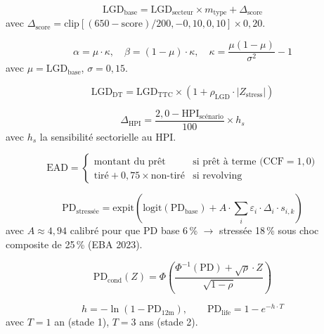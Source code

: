 \documentclass[10pt, a4paper, oneside]{report}
\theoremstyle{definition}
\begin{document}
\begin{equation}
\text{LGD}_{\text{base}} = \text{LGD}_{\text{secteur}} \times m_{\text{type}} + \Delta_{\text{score}}
\label{eq:lgd-base}
\end{equation}
avec $\Delta_{\text{score}} = \text{clip}[(650 - \text{score})/200, -0{,}10, 0{,}10] \times 0{,}20$.

\begin{equation}
\alpha = \mu \cdot \kappa, \quad \beta = (1 - \mu) \cdot \kappa, \quad \kappa = \frac{\mu(1-\mu)}{\sigma^2} - 1
\label{eq:beta-params}
\end{equation}
avec $\mu = \text{LGD}_{\text{base}}$, $\sigma = 0{,}15$.

\begin{equation}
\text{LGD}_{\text{DT}} = \text{LGD}_{\text{TTC}} \times (1 + \rho_{\text{LGD}} \cdot |Z_{\text{stress}}|)
\label{eq:lgd-downturn}
\end{equation}

\begin{equation}
\Delta_{\text{HPI}} = \frac{2{,}0 - \text{HPI}_{\text{scénario}}}{100} \times h_s
\label{eq:lgd-hpi}
\end{equation}
avec $h_s$ la sensibilité sectorielle au HPI.

\begin{equation}
\text{EAD} = \begin{cases} \text{montant du prêt} & \text{si prêt à terme (CCF} = 1{,}0\text{)} \\ \text{tiré} + 0{,}75 \times \text{non-tiré} & \text{si revolving} \end{cases}
\label{eq:ead}
\end{equation}

\begin{equation}
\text{PD}_{\text{stressée}} = \text{expit}\!\left(\text{logit}(\text{PD}_{\text{base}}) + A \cdot \sum_i \varepsilon_i \cdot \Delta_i \cdot s_{i,k}\right)
\label{eq:pd-stress}
\end{equation}
avec $A \approx 4{,}94$ calibré pour que PD base 6\,\% $\to$ stressée 18\,\% sous choc composite de 25\,\% (EBA 2023).

\begin{equation}
\text{PD}_{\text{cond}}(Z) = \Phi\!\left(\frac{\Phi^{-1}(\text{PD}) + \sqrt{\rho} \cdot Z}{\sqrt{1 - \rho}}\right)
\label{eq:vasicek}
\end{equation}

\begin{equation}
h = -\ln(1 - \text{PD}_{12\text{m}}), \qquad \text{PD}_{\text{life}} = 1 - e^{-h \cdot T}
\label{eq:pd-lifetime}
\end{equation}
avec $T = 1$ an (stade 1), $T = 3$ ans (stade 2).
\end{document}
